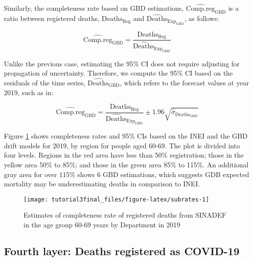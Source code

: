 \documentclass[
]{article}
\begin{document}
Similarly, the completeness rate based on GBD estimations, \(\widehat{\text{Comp.reg}}_\text{GBD}\) is a ratio between registered deaths, \(\text{Deaths}_\text{Reg}\) and \(\widehat{\text{Deaths}}_{\text{Exp}_\text{GBD}}\), as follows:

\begin{equation}
  \label{eq:7}
 \widehat{\text{Comp.reg}}_\text{GBD}= \frac{\text{Deaths}_\text{Reg}}{\widehat{\text{Deaths}}_{\text{Exp}_\text{GBD}}}
\end{equation}

Unlike the previous case, estimating the 95\% CI does not require adjusting for propagation of uncertainty. Therefore, we compute the 95\% CI based on the residuals of the time series, \(\widehat{\text{Deaths}}_\text{GBD}\), which refers to the forecast values at year 2019, such as in:

\begin{equation}
  \label{eq:8}
  \widehat{\text{Comp.reg}}_\text{GBD}=\frac{\text{Deaths}_\text{Reg}}{\widehat{\text{Deaths}}_{\text{Exp}_\text{GBD}}} \pm 1.96\sqrt{\hat{\sigma}_{\text{Deaths}_\text{GBD}}}
\end{equation}

Figure \ref{fig:subrates} shows completeness rates and 95\% CIs based on the INEI and the GBD drift models for 2019, by region for people aged 60-69. The plot is divided into four levels. Regions in the red area have less than 50\% registration; those in the yellow area 50\% to 85\%; and those in the green area 85\% to 115\%. An additional gray area for over 115\% shows 6 GBD estimations, which suggests GDB expected mortality may be underestimating deaths in comparison to INEI.

\begin{figure}[H]

{\centering \texttt{[image: tutorial3final\_files/figure-latex/subrates-1]} 

}

\caption{Estimates of completeness rate of registered deaths from SINADEF in the age group 60-69 years by Department in 2019}\label{fig:subrates}
\end{figure}

\hypertarget{fourth-layer-deaths-registered-as-covid-19}{%
\subsection{Fourth layer: Deaths registered as COVID-19}\label{fourth-layer-deaths-registered-as-covid-19}}
\end{document}
